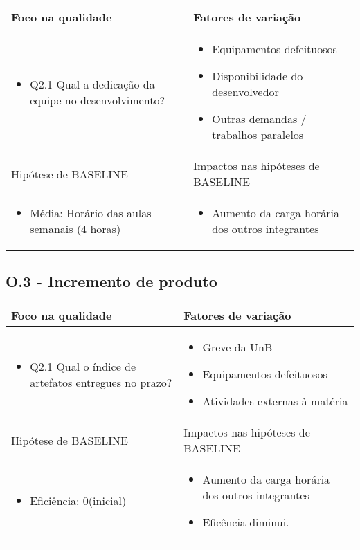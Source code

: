 	\begin{tabular}{ |p{4cm}|p{6cm}|  }
	 \hline
	 Foco na qualidade 		& 		Fatores de variação \\
	 \hline
	 \begin{itemize} \item Q2.1 Qual a dedicação da equipe no desenvolvimento? \end{itemize} & \begin{itemize} \item Equipamentos defeituosos \item Disponibilidade do desenvolvedor \end{itemize} \begin{itemize} \item Outras demandas / trabalhos paralelos \end{itemize}\\
	 \hline
	 Hipótese de BASELINE 		& 		Impactos nas hipóteses de BASELINE \\
	 \hline
	 \begin{itemize} \item Média: Horário das aulas semanais (4 horas)  \end{itemize} 		& 		\begin{itemize} \item Aumento da carga horária dos outros integrantes \end{itemize} \\
	 \hline
	\end{tabular}

\subsection{O.3 - Incremento de produto}

	\begin{tabular}{ |p{6cm}|p{6cm}|  }
	 \hline
	 Foco na qualidade 		& 		Fatores de variação \\
	 \hline
	 \begin{itemize} \item Q2.1 Qual o índice de artefatos entregues no prazo?\end{itemize} 	
	  & \begin{itemize} \item Greve da UnB \item Equipamentos defeituosos \item Atividades externas à matéria \end{itemize}\\
	 \hline
	 Hipótese de BASELINE 		& 		Impactos nas hipóteses de BASELINE \\
	 \hline
	 \begin{itemize} \item Eficiência: 0(inicial) \end{itemize} & \begin{itemize} \item Aumento da carga horária dos outros integrantes \item Eficência diminui.\end{itemize} \\
	 \hline
	\end{tabular}
